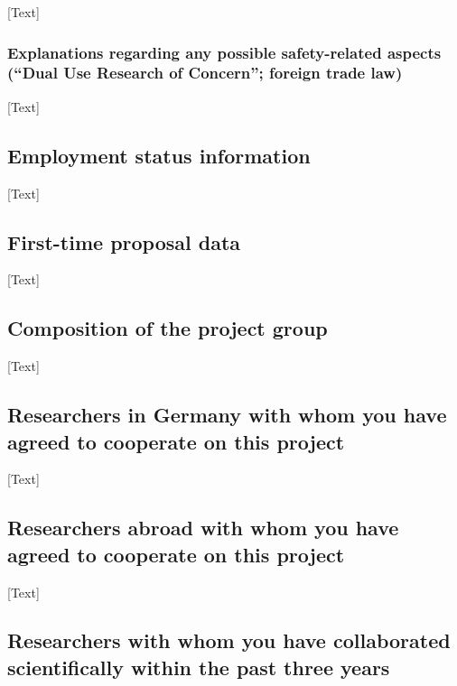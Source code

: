 [Text]

\subsubsection{Explanations regarding any possible safety-related aspects (``Dual Use Research of Concern''; foreign trade law)}

[Text]

\subsection{Employment status information}

[Text]

\subsection{First-time proposal data}

[Text]

\subsection{Composition of the project group}

[Text]

\subsection{Researchers in Germany with whom you have agreed to cooperate on this project}

[Text]

\subsection{Researchers abroad with whom you have agreed to cooperate on this project}

[Text]

\subsection{Researchers with whom you have collaborated scientifically within the past three years}


